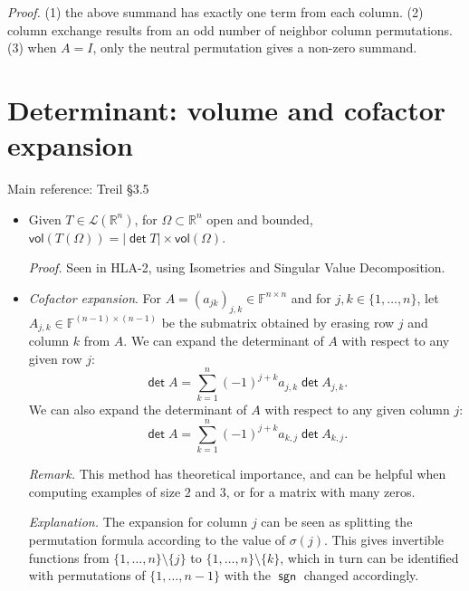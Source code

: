 \documentclass[11pt]{article}
\newcommand{\1}{\mathbf{1}}
\newcommand{\0}{\mathbf{0}}
\newcommand{\F}{\mathbb{F}}
\newcommand{\cL}{\mathcal{L}}
\newcommand{\R}{\mathbb{R}}
\DeclareMathOperator{\mydet}{\mathsf{det}}
\DeclareMathOperator{\mysgn}{\mathsf{sgn}}
\newcommand{\spitem}{\item[$\circ$]}
\begin{document}
\begin{itemize}
\emph{Proof.}
(1) the above summand has exactly one term from each column.
(2) column exchange results from an odd number of neighbor column permutations.
(3) when $A=I$, only the neutral permutation gives a non-zero summand.

\end{itemize}


\clearpage
\section{Determinant: volume and cofactor expansion}

Main reference:
Treil
\S3.5

\begin{itemize}

\spitem

Given $T\in\cL(\R^n)$, for $\Omega \subset \R^n$ open and bounded,
$\mathsf{vol}(T(\Omega))=|\mydet T| \times \mathsf{vol}(\Omega)$.

\emph{Proof.} Seen in HLA-2, using Isometries and Singular Value Decomposition.

\item

\emph{Cofactor expansion}.
For $A=(a_{jk})_{j,k} \in \F^{n \times n}$ and for $j,k\in\{1,\dots,n\}$, let $A_{j,k} \in \F^{(n-1)\times(n-1)}$ be the submatrix obtained by erasing row $j$ and column $k$ from $A$.
We can expand the determinant of $A$ with respect to any given row $j$:
\[
\mydet A=\sum_{k=1}^n (-1)^{j+k}a_{j,k}\mydet A_{j,k}.
\]
We can also expand the determinant of $A$ with respect to any given column $j$:
\[
\mydet A=\sum_{k=1}^n (-1)^{j+k}a_{k,j}\mydet A_{k,j}.
\]

\emph{Remark.}
This method has theoretical importance, and can be helpful when computing examples of size $2$ and $3$, or for a matrix with many zeros.

\emph{Explanation.}
The expansion for column $j$ can be seen as splitting the permutation formula according to the value of $\sigma(j)$.
This gives invertible functions from $\{1,\dots,n\}\setminus\{j\}$ to $\{1,\dots,n\}\setminus\{k\}$, which in turn can be identified with permutations of $\{1,\dots,n-1\}$ with the $\mysgn$ changed accordingly.




\end{itemize}
\end{document}

